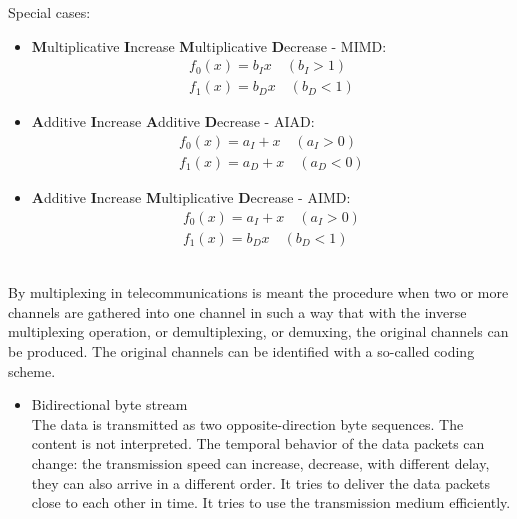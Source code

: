 \documentclass[margin=0px]{article}
\begin{document}
\begin{description}
        Special cases:
        \begin{itemize}
            \item \textbf{M}ultiplicative \textbf{I}ncrease \textbf{M}ultiplicative \textbf{D}ecrease - MIMD:
                  \begin{align*}
                      f_0(x) = b_Ix \quad (b_I > 1) \\
                      f_1(x) = b_Dx \quad (b_D < 1)
                  \end{align*}
            \item \textbf{A}dditive \textbf{I}ncrease \textbf{A}dditive \textbf{D}ecrease - AIAD:
                  \begin{align*}
                      f_0(x) = a_I+x \quad (a_I > 0) \\
                      f_1(x) = a_D+x \quad (a_D < 0)
                  \end{align*}
            \item \textbf{A}dditive \textbf{I}ncrease \textbf{M}ultiplicative \textbf{D}ecrease - AIMD:
                  \begin{align*}
                      f_0(x) = a_I+x \quad (a_I > 0) \\
                      f_1(x) = b_Dx \quad (b_D < 1)
                  \end{align*}
        \end{itemize}

    \item[Multiplexing, demultiplexing] \hfill \\
        By multiplexing in telecommunications is meant the procedure when two or more channels are gathered into one channel in such a way that with the inverse multiplexing operation, or demultiplexing, or demuxing, the original channels can be produced. The original channels can be identified with a so-called coding scheme.
    \item[Interaction models] \hfill
        \begin{itemize}
            \item Bidirectional byte stream \\
                  The data is transmitted as two opposite-direction byte sequences. The content is not interpreted. The temporal behavior of the data packets can change: the transmission speed can increase, decrease, with different delay, they can also arrive in a different order. It tries to deliver the data packets close to each other in time. It tries to use the transmission medium efficiently.


\end{itemize}
\end{description}
\end{document}
